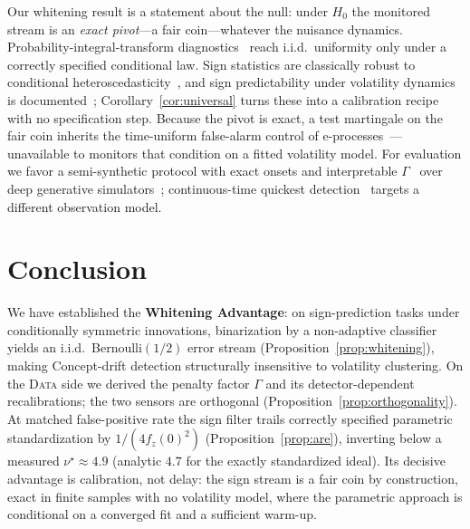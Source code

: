 \documentclass[sigconf,anonymous,review]{acmart}
\theoremstyle{acmdefinition}
\begin{document}
Our whitening result is a statement about the null: under $H_0$ the monitored stream is an \emph{exact pivot}---a fair coin---whatever the nuisance dynamics. Probability-integral-transform diagnostics~\cite{diebold_1998} reach i.i.d.\ uniformity only under a correctly specified conditional law. Sign statistics are classically robust to conditional heteroscedasticity~\cite{campbell_dufour_1995}, and sign predictability under volatility dynamics is documented~\cite{christoffersen_diebold_2006}; Corollary~\ref{cor:universal} turns these into a calibration recipe with no specification step. Because the pivot is exact, a test martingale on the fair coin inherits the time-uniform false-alarm control of e-processes~\cite{ville_1939, ramdas_2023, shin_2024}---unavailable to monitors that condition on a fitted volatility model. For evaluation we favor a semi-synthetic protocol with exact onsets and interpretable $\Gamma$~\cite{suarez_cetrulo_proteus_2025} over deep generative simulators~\cite{cetingoz_lehalle_2025}; continuous-time quickest detection~\cite{chevalier_2023} targets a different observation model.

\section{Conclusion}\label{sec:conclusion}

We have established the \textbf{Whitening Advantage}: on sign-prediction tasks under conditionally symmetric innovations, binarization by a non-adaptive classifier yields an i.i.d.\ Bernoulli$(1/2)$ error stream (Proposition~\ref{prop:whitening}), making Concept-drift detection structurally insensitive to volatility clustering. On the \textsc{Data} side we derived the penalty factor $\Gamma$ and its detector-dependent recalibrations; the two sensors are orthogonal (Proposition~\ref{prop:orthogonality}). At matched false-positive rate the sign filter trails correctly specified parametric standardization by $1/(4f_z(0)^2)$ (Proposition~\ref{prop:are}), inverting below a measured $\nu^{\star} \approx 4.9$ (analytic $4.7$ for the exactly standardized ideal). Its decisive advantage is calibration, not delay: the sign stream is a fair coin by construction, exact in finite samples with no volatility model, where the parametric approach is conditional on a converged fit and a sufficient warm-up.
\end{document}
